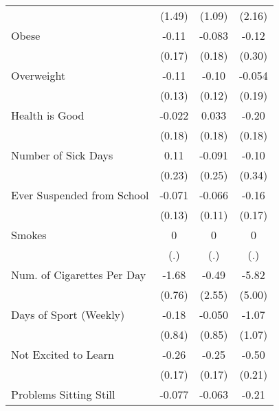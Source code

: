{\begin{tabular}{l*{3}{c}}
            &      (1.49)         &      (1.09)         &      (2.16)         \\
\addlinespace
Obese       &       -0.11         &      -0.083         &       -0.12         \\
            &      (0.17)         &      (0.18)         &      (0.30)         \\
\addlinespace
Overweight  &       -0.11         &       -0.10         &      -0.054         \\
            &      (0.13)         &      (0.12)         &      (0.19)         \\
\addlinespace
Health is Good&      -0.022         &       0.033         &       -0.20         \\
            &      (0.18)         &      (0.18)         &      (0.18)         \\
\addlinespace
Number of Sick Days&        0.11         &      -0.091         &       -0.10         \\
            &      (0.23)         &      (0.25)         &      (0.34)         \\
\addlinespace
Ever Suspended from School&      -0.071         &      -0.066         &       -0.16         \\
            &      (0.13)         &      (0.11)         &      (0.17)         \\
\addlinespace
Smokes      &           0         &           0         &           0         \\
            &         (.)         &         (.)         &         (.)         \\
\addlinespace
Num. of Cigarettes Per Day&       -1.68\sym{*}  &       -0.49         &       -5.82         \\
            &      (0.76)         &      (2.55)         &      (5.00)         \\
\addlinespace
Days of Sport (Weekly)&       -0.18         &      -0.050         &       -1.07         \\
            &      (0.84)         &      (0.85)         &      (1.07)         \\
\addlinespace
Not Excited to Learn&       -0.26         &       -0.25         &       -0.50\sym{*}  \\
            &      (0.17)         &      (0.17)         &      (0.21)         \\
\addlinespace
Problems Sitting Still&      -0.077         &      -0.063         &       -0.21         \\

\end{tabular}}

